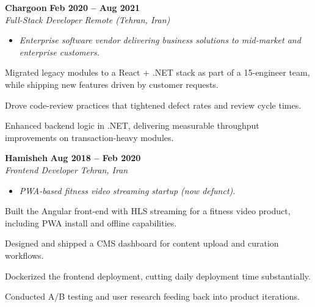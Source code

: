 \documentclass[letterpaper,10pt]{article}
\newcommand{\heading}[2]{
  \hspace{10pt}#1\hfill#2\\
}
\newcommand{\headingBf}[2]{
  \heading{\textbf{#1}}{\textbf{#2}}
}
\newcommand{\headingIt}[2]{
  \heading{\textit{#1}}{\textit{#2}}
}
\newenvironment{resume_list}{
  \vspace{-7pt}
  \begin{itemize}[itemsep=-2px, parsep=1pt, leftmargin=30pt]
}{
  \end{itemize}
  \vspace{2pt}
}
\newcommand{\companyDescription}[1]{
  \vspace{-7pt}
  \begin{itemize}[itemsep=-2px, parsep=1pt, leftmargin=12pt]
    \item[] {\color{textMuted}\textit{#1}}
  \end{itemize}
  \vspace{-4pt}
}
\begin{document}
  \headingBf{ Chargoon }{ Feb 2020 -- Aug 2021 }
  \headingIt{ Full-Stack Developer }{ Remote (Tehran, Iran) }
  \companyDescription{ Enterprise software vendor delivering business solutions to mid-market and enterprise customers. }
  \begin{resume_list}
    \item Migrated legacy modules to a React + .NET stack as part of a 15-engineer team, while shipping new features driven by customer requests.
    \item Drove code-review practices that tightened defect rates and review cycle times.
    \item Enhanced backend logic in .NET, delivering measurable throughput improvements on transaction-heavy modules.
  \end{resume_list}

  \headingBf{ Hamisheh }{ Aug 2018 -- Feb 2020 }
  \headingIt{ Frontend Developer }{ Tehran, Iran }
  \companyDescription{ PWA-based fitness video streaming startup (now defunct). }
  \begin{resume_list}
    \item Built the Angular front-end with HLS streaming for a fitness video product, including PWA install and offline capabilities.
    \item Designed and shipped a CMS dashboard for content upload and curation workflows.
    \item Dockerized the frontend deployment, cutting daily deployment time substantially.
    \item Conducted A/B testing and user research feeding back into product iterations.
  \end{resume_list}
\end{document}
